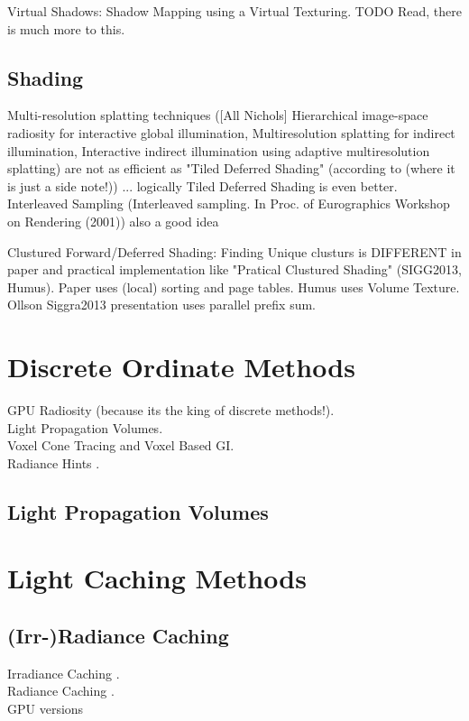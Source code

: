 \documentclass[thesis.tex]{subfiles}
\begin{document}
Virtual Shadows: Shadow Mapping using a Virtual Texturing. TODO Read, there is much more to this. \cite{bib:virtualshadowmaps}

\subsection{Shading}
Multi-resolution splatting techniques ([All Nichols] Hierarchical
image-space radiosity for interactive global illumination, Multiresolution splatting for indirect illumination, Interactive indirect illumination using adaptive multiresolution splatting) are not as efficient as "Tiled Deferred Shading" (according to \cite{bib:clusturedpreconvoledradiancecaching} (where it is just a side note!)) ... logically Tiled Deferred Shading is even better.
Interleaved Sampling (Interleaved sampling. In
Proc. of Eurographics Workshop on Rendering (2001)) also a good idea 

Clustured Forward/Deferred Shading: Finding Unique clusturs is DIFFERENT in paper \cite{bib:clusturedshading} and practical implementation like "Pratical Clustured Shading" (SIGG2013, Humus). Paper uses (local) sorting and page tables. Humus uses Volume Texture. Ollson Siggra2013 presentation uses parallel prefix sum.



\section{Discrete Ordinate Methods}
GPU Radiosity (because its the king of discrete methods!).\\
Light Propagation Volumes.\\
Voxel Cone Tracing and Voxel Based GI.\\
Radiance Hints \cite{bib:radiancehints}.


\subsection{Light Propagation Volumes}


\section{Light Caching Methods}

\subsection{(Irr-)Radiance Caching}
Irradiance Caching \cite{bib:irradiancecaching}.\\
Radiance Caching \cite{bib:radiancecaching}.\\
GPU versions
\end{document}
